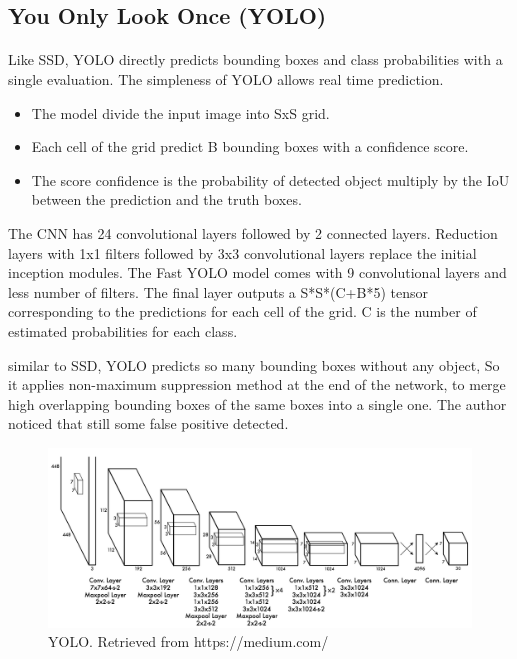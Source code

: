 \documentclass[12pt]{report}
\begin{document}
                \subsection{You Only Look Once (YOLO)}
                \paragraph{}
                    Like SSD, YOLO directly predicts bounding boxes and class probabilities
                    with a single evaluation. The simpleness of YOLO allows real time prediction.
                    \begin{itemize}
                        \item The model divide the input image into SxS grid.
                        \item Each cell of the grid predict B bounding boxes with a confidence score.
                        \item The score confidence is the probability of detected object multiply by the IoU between the prediction and the truth boxes.
                    \end{itemize}
                    The CNN has 24 convolutional layers followed by 2 connected layers.
                    Reduction layers with 1x1 filters followed by 3x3 convolutional layers 
                    replace the initial inception modules.
                    \bigbreak
                    The Fast YOLO model comes with 9  convolutional layers and less number of filters.
                    The final layer outputs a S*S*(C+B*5) tensor corresponding to the predictions for each cell of the grid.
                    C is the number of estimated probabilities for each class.

                    similar to SSD, YOLO predicts so many bounding boxes without any object,
                    So it applies non-maximum suppression method at the end of the network,
                    to merge high overlapping bounding boxes of the same boxes into a single one.
                    The author noticed that still some false positive detected.

                    
                    \bigbreak
                    \bigbreak
                    \bigbreak


                    \begin{figure}[h]
                    \centering
                    \includegraphics[width=1\textwidth]{./images/yolo.png}
                    \caption{YOLO. Retrieved from https://medium.com/}
                    \label{fig:frcnn}
                    \end{figure} 
\end{document}

